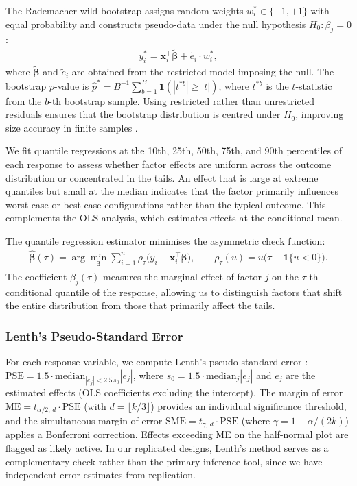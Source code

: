 The Rademacher wild bootstrap assigns random weights $w_i^* \in \{-1, +1\}$ with equal probability and constructs pseudo-data under the null hypothesis $H_0\!: \beta_j = 0$:
\begin{align}
  y_i^* = \mathbf{x}_i^\top \tilde{\boldsymbol{\beta}} + \tilde{e}_i \cdot w_i^*,
  \label{eq:wildboot}
\end{align}
where $\tilde{\boldsymbol{\beta}}$ and $\tilde{e}_i$ are obtained from the restricted model imposing the null. The bootstrap $p$-value is $\hat{p}^* = B^{-1}\sum_{b=1}^{B} \mathbf{1}(|t^{*b}| \geq |t|)$, where $t^{*b}$ is the $t$-statistic from the $b$-th bootstrap sample. Using restricted rather than unrestricted residuals ensures that the bootstrap distribution is centred under $H_0$, improving size accuracy in finite samples \citep{DavidsonFlachaire2008}.

We fit quantile regressions at the 10th, 25th, 50th, 75th, and 90th percentiles of each response to assess whether factor effects are uniform across the outcome distribution or concentrated in the tails. An effect that is large at extreme quantiles but small at the median indicates that the factor primarily influences worst-case or best-case configurations rather than the typical outcome. This complements the OLS analysis, which estimates effects at the conditional mean.

The quantile regression estimator \citep{KoenkerBassett1978} minimises the asymmetric check function:
\begin{align}
  \hat{\boldsymbol{\beta}}(\tau) = \arg\min_{\boldsymbol{\beta}} \sum_{i=1}^{n} \rho_\tau\!\bigl(y_i - \mathbf{x}_i^\top \boldsymbol{\beta}\bigr), \qquad \rho_\tau(u) = u\bigl(\tau - \mathbf{1}\{u < 0\}\bigr).
  \label{eq:quantreg}
\end{align}
The coefficient $\beta_j(\tau)$ measures the marginal effect of factor $j$ on the $\tau$-th conditional quantile of the response, allowing us to distinguish factors that shift the entire distribution from those that primarily affect the tails.

\subsubsection{Lenth's Pseudo-Standard Error}

For each response variable, we compute Lenth's pseudo-standard error \citep{Lenth1989}: $\text{PSE} = 1.5 \cdot \text{median}_{|e_j| < 2.5\,s_0} |e_j|$, where $s_0 = 1.5 \cdot \text{median}_j |e_j|$ and $e_j$ are the estimated effects (OLS coefficients excluding the intercept). The margin of error $\text{ME} = t_{\alpha/2,\, d} \cdot \text{PSE}$ (with $d = \lfloor k/3 \rfloor$) provides an individual significance threshold, and the simultaneous margin of error $\text{SME} = t_{\gamma,\, d} \cdot \text{PSE}$ (where $\gamma = 1 - \alpha/(2k)$) applies a Bonferroni correction. Effects exceeding ME on the half-normal plot are flagged as likely active. In our replicated designs, Lenth's method serves as a complementary check rather than the primary inference tool, since we have independent error estimates from replication.

